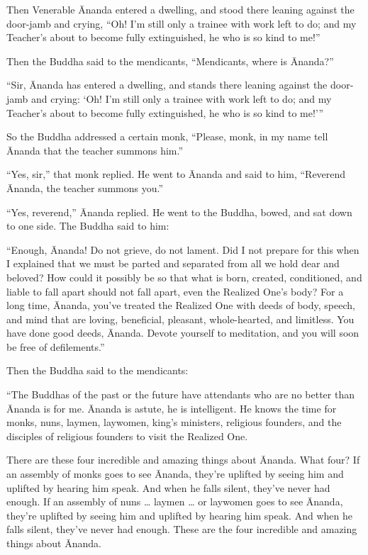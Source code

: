 \documentclass[12pt,openany]{book}%
\begin{document}
Then Venerable Ānanda entered a dwelling, and stood there leaning against the door-jamb and crying, “Oh! I’m still only a trainee with work left to do; and my Teacher’s about to become fully extinguished, he who is so kind to me!” 

Then the Buddha said to the mendicants, “Mendicants, where is Ānanda?” 

“Sir, Ānanda has entered a dwelling, and stands there leaning against the door-jamb and crying: ‘Oh! I’m still only a trainee with work left to do; and my Teacher’s about to become fully extinguished, he who is so kind to me!’” 

So the Buddha addressed a certain monk, “Please, monk, in my name tell Ānanda that the teacher summons him.” 

“Yes, sir,” that monk replied. He went to Ānanda and said to him, “Reverend Ānanda, the teacher summons you.” 

“Yes, reverend,” Ānanda replied. He went to the Buddha, bowed, and sat down to one side. The Buddha said to him: 

“Enough, Ānanda! Do not grieve, do not lament. Did I not prepare for this when I explained that we must be parted and separated from all we hold dear and beloved? How could it possibly be so that what is born, created, conditioned, and liable to fall apart should not fall apart, even the Realized One’s body? For a long time, Ānanda, you’ve treated the Realized One with deeds of body, speech, and mind that are loving, beneficial, pleasant, whole-hearted, and limitless. You have done good deeds, Ānanda. Devote yourself to meditation, and you will soon be free of defilements.” 

Then the Buddha said to the mendicants: 

“The Buddhas of the past or the future have attendants who are no better than Ānanda is for me. Ānanda is astute, he is intelligent. He knows the time for monks, nuns, laymen, laywomen, king’s ministers, religious founders, and the disciples of religious founders to visit the Realized One. 

There are these four incredible and amazing things about Ānanda. What four? If an assembly of monks goes to see Ānanda, they’re uplifted by seeing him and uplifted by hearing him speak. And when he falls silent, they’ve never had enough. If an assembly of nuns … laymen … or laywomen goes to see Ānanda, they’re uplifted by seeing him and uplifted by hearing him speak. And when he falls silent, they’ve never had enough. These are the four incredible and amazing things about Ānanda. 
\end{document}
